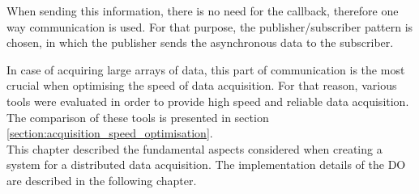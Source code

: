         When sending this information, there is no need for the callback, therefore one way communication is used. 
        For that purpose, the publisher/subscriber pattern is chosen, in which the publisher sends the asynchronous data to the subscriber. 
        
        In case of acquiring large arrays of data, this part of communication is the most crucial when optimising the speed of data acquisition. For that reason, various tools were evaluated in order to provide high speed and reliable data acquisition. The comparison of these tools is presented in section \ref{section:acquisition_speed_optimisation}.\\

    
    
    
     This chapter described the fundamental aspects considered when creating a system for a distributed data acquisition. The implementation details of the DO are described in the following chapter.

